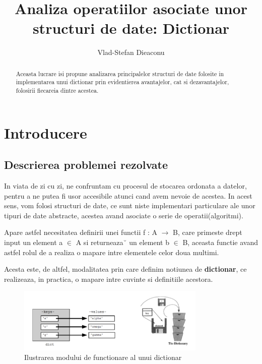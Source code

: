\documentclass[runningheads]{llncs}
\begin{document}
%
\title{Analiza operatiilor asociate unor structuri de date: Dictionar}
%
%
\author{Vlad-Stefan Dieaconu} 
%
%
%
\maketitle              %
%
\begin{abstract}
Aceasta lucrare isi propune analizarea principalelor structuri de date folosite in implementarea unui dictionar prin evidentierea avantajelor, cat si dezavantajelor, folosirii fiecareia dintre acestea.

\end{abstract}
%
%
%
\section{Introducere}

\subsection{Descrierea problemei rezolvate}
\quad  In viata de zi cu zi, ne confruntam cu procesul de stocarea ordonata a datelor, pentru a ne putea fi usor accesibile atunci cand avem nevoie de acestea. In acest sens, vom folosi structuri de date, ce sunt niste implementari particulare ale unor tipuri de date abstracte, acestea avand asociate o serie de operatii(algoritmi).

Apare astfel necesitatea definirii unei functii f : A $\rightarrow$ B, care primeste drept input un element a $\in$ A si returneaza˘ un element b $\in$ B, aceasta functie avand astfel rolul de a  realiza o mapare intre elementele celor doua multimi.

Acesta este, de altfel, modalitatea prin care definim notiunea de \textbf{dictionar}, ce realizeaza, in practica, o mapare intre cuvinte si definitiile acestora. 

\begin{figure}[ht!]
\includegraphics[width=90mm]{1.PNG}
\caption{Ilustrarea modului de functionare al unui dictionar \label{overflow}}
\end{figure}
\end{document}
